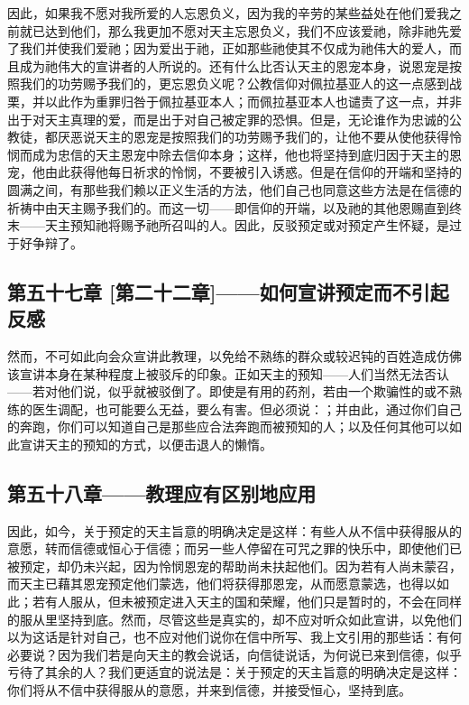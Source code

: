 因此，如果我不愿对我所爱的人忘恩负义，因为我的辛劳的某些益处在他们爱我之前就已达到他们，那么我更加不愿对天主忘恩负义，我们不应该爱祂，除非祂先爱了我们并使我们爱祂；因为爱出于祂，正如那些祂使其不仅成为祂伟大的爱人，而且成为祂伟大的宣讲者的人所说的。还有什么比否认天主的恩宠本身，说恩宠是按照我们的功劳赐予我们的，更忘恩负义呢？公教信仰对佩拉基亚人的这一点感到战栗，并以此作为重罪归咎于佩拉基亚本人；而佩拉基亚本人也谴责了这一点，并非出于对天主真理的爱，而是出于对自己被定罪的恐惧。但是，无论谁作为忠诚的公教徒，都厌恶说天主的恩宠是按照我们的功劳赐予我们的，让他不要从使他获得怜悯而成为忠信的天主恩宠中除去信仰本身；这样，他也将坚持到底归因于天主的恩宠，他由此获得他每日祈求的怜悯，不要被引入诱惑。但是在信仰的开端和坚持的圆满之间，有那些我们赖以正义生活的方法，他们自己也同意这些方法是在信德的祈祷中由天主赐予我们的。而这一切——即信仰的开端，以及祂的其他恩赐直到终末——天主预知祂将赐予祂所召叫的人。因此，反驳预定或对预定产生怀疑，是过于好争辩了。\par


\subsection{第五十七章 [第二十二章]——如何宣讲预定而不引起反感}

然而，不可如此向会众宣讲此教理，以免给不熟练的群众或较迟钝的百姓造成仿佛该宣讲本身在某种程度上被驳斥的印象。正如天主的预知——人们当然无法否认——若对他们说，似乎就被驳倒了。即使是有用的药剂，若由一个欺骗性的或不熟练的医生调配，也可能要么无益，要么有害。但必须说：；并由此，通过你们自己的奔跑，你们可以知道自己是那些应合法奔跑而被预知的人；以及任何其他可以如此宣讲天主的预知的方式，以便击退人的懒惰。\par


\subsection{第五十八章——教理应有区别地应用}

因此，如今，关于预定的天主旨意的明确决定是这样：有些人从不信中获得服从的意愿，转而信德或恒心于信德；而另一些人停留在可咒之罪的快乐中，即使他们已被预定，却仍未兴起，因为怜悯恩宠的帮助尚未扶起他们。因为若有人尚未蒙召，而天主已藉其恩宠预定他们蒙选，他们将获得那恩宠，从而愿意蒙选，也得以如此；若有人服从，但未被预定进入天主的国和荣耀，他们只是暂时的，不会在同样的服从里坚持到底。然而，尽管这些是真实的，却不应对听众如此宣讲，以免他们以为这话是针对自己，也不应对他们说你在信中所写、我上文引用的那些话：有何必要说？因为我们若是向天主的教会说话，向信徒说话，为何说已来到信德，似乎亏待了其余的人？我们更适宜的说法是：关于预定的天主旨意的明确决定是这样：你们将从不信中获得服从的意愿，并来到信德，并接受恒心，坚持到底。\par

